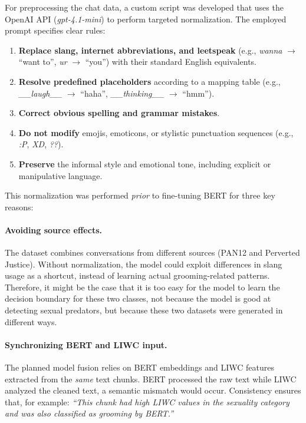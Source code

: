 For preprocessing the chat data, a custom script was developed that uses the OpenAI API (\textit{gpt-4.1-mini}) to perform targeted normalization. The employed prompt specifies clear rules:
\begin{enumerate}
    \item \textbf{Replace slang, internet abbreviations, and leetspeak} (e.g., \textit{wanna} $\rightarrow$ ``want to'', \textit{ur} $\rightarrow$ ``you'') with their standard English equivalents.
    \item \textbf{Resolve predefined placeholders} according to a mapping table (e.g., \textit{\_\_laugh\_\_} $\rightarrow$ ``haha'', \textit{\_\_thinking\_\_} $\rightarrow$ ``hmm'').
    \item \textbf{Correct obvious spelling and grammar mistakes}.
    \item \textbf{Do not modify} emojis, emoticons, or stylistic punctuation sequences (e.g., \textit{:P}, \textit{XD}, \textit{??}).
    \item \textbf{Preserve} the informal style and emotional tone, including explicit or manipulative language.
\end{enumerate}

This normalization was performed \emph{prior} to fine-tuning BERT for three key reasons:

\paragraph{Avoiding source effects.}  
The dataset combines conversations from different sources (PAN12 and Perverted Justice). Without normalization, the model could exploit differences in slang usage as a shortcut, instead of learning actual grooming-related patterns. Therefore, it might be the case that it is too easy for the model to learn the decision boundary for these two classes, not because the model is good at detecting sexual predators, but because these two datasets were generated in different ways. \parencite{schlaepfer2022online}

\paragraph{Synchronizing BERT and LIWC input.}  
The planned model fusion relies on BERT embeddings and LIWC features extracted from the \emph{same} text chunks. BERT processed the raw text while LIWC analyzed the cleaned text, a semantic mismatch would occur. \cite{he2021deberta} Consistency ensures that, for example:  
\textit{``This chunk had high LIWC values in the sexuality category and was also classified as grooming by BERT.''}

